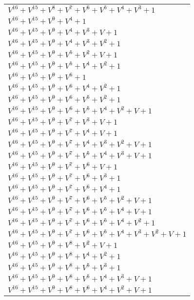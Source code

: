 \documentclass[12pt]{article}
\begin{document}
\begin{adjustwidth}{-4cm}{}
\begin{center}
\begin{longtable}{|l|}
$V^{16}  +V^{15}  +V^{8}  +V^{7}  +V^{6}  +V^{5}  +V^{4}  +V^{3}  + 1$ \\
$V^{16}  +V^{15}  +V^{9}  +V^{4}  + 1$ \\
$V^{16}  +V^{15}  +V^{9}  +V^{4}  +V^{3}  + V + 1$ \\
$V^{16}  +V^{15}  +V^{9}  +V^{4}  +V^{3}  +V^{2}  + 1$ \\
$V^{16}  +V^{15}  +V^{9}  +V^{5}  +V^{2}  + V + 1$ \\
$V^{16}  +V^{15}  +V^{9}  +V^{5}  +V^{4}  +V^{2}  + 1$ \\
$V^{16}  +V^{15}  +V^{9}  +V^{6}  + 1$ \\
$V^{16}  +V^{15}  +V^{9}  +V^{6}  +V^{4}  +V^{2}  + 1$ \\
$V^{16}  +V^{15}  +V^{9}  +V^{6}  +V^{5}  +V^{2}  + 1$ \\
$V^{16}  +V^{15}  +V^{9}  +V^{6}  +V^{5}  +V^{4}  +V^{2}  + V + 1$ \\
$V^{16}  +V^{15}  +V^{9}  +V^{7}  +V^{3}  + V + 1$ \\
$V^{16}  +V^{15}  +V^{9}  +V^{7}  +V^{4}  + V + 1$ \\
$V^{16}  +V^{15}  +V^{9}  +V^{7}  +V^{4}  +V^{3}  +V^{2}  + V + 1$ \\
$V^{16}  +V^{15}  +V^{9}  +V^{7}  +V^{5}  +V^{4}  +V^{3}  + V + 1$ \\
$V^{16}  +V^{15}  +V^{9}  +V^{7}  +V^{6}  + V + 1$ \\
$V^{16}  +V^{15}  +V^{9}  +V^{7}  +V^{6}  +V^{3}  + 1$ \\
$V^{16}  +V^{15}  +V^{9}  +V^{7}  +V^{6}  +V^{4}  + 1$ \\
$V^{16}  +V^{15}  +V^{9}  +V^{7}  +V^{6}  +V^{5}  +V^{2}  + V + 1$ \\
$V^{16}  +V^{15}  +V^{9}  +V^{7}  +V^{6}  +V^{5}  +V^{4}  + V + 1$ \\
$V^{16}  +V^{15}  +V^{9}  +V^{7}  +V^{6}  +V^{5}  +V^{4}  +V^{2}  + 1$ \\
$V^{16}  +V^{15}  +V^{9}  +V^{7}  +V^{6}  +V^{5}  +V^{4}  +V^{3}  +V^{2}  + V + 1$ \\
$V^{16}  +V^{15}  +V^{9}  +V^{8}  +V^{2}  + V + 1$ \\
$V^{16}  +V^{15}  +V^{9}  +V^{8}  +V^{4}  +V^{2}  + 1$ \\
$V^{16}  +V^{15}  +V^{9}  +V^{8}  +V^{5}  +V^{3}  + 1$ \\
$V^{16}  +V^{15}  +V^{9}  +V^{8}  +V^{5}  +V^{4}  +V^{3}  + V + 1$ \\
$V^{16}  +V^{15}  +V^{9}  +V^{8}  +V^{6}  +V^{4}  +V^{2}  + V + 1$ \\

\end{longtable}
\end{center}
\end{adjustwidth}
\end{document}

